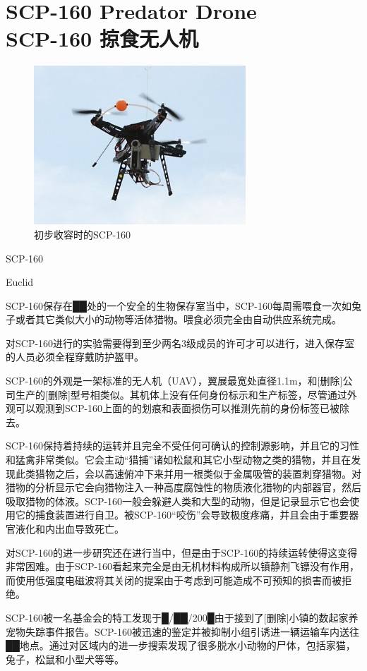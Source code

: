 \chapter[SCP-160 掠食无人机]{
    SCP-160 Predator Drone\\
    SCP-160 掠食无人机
}

\label{chap:SCP-160}

\begin{figure}[H]
    \centering
    \includegraphics[width=0.5\linewidth]{images/SCP.160.jpg}
    \caption*{初步收容时的SCP-160}
\end{figure}

SCP-160

Euclid

SCP-160保存在██处的一个安全的生物保存室当中，SCP-160每周需喂食一次如兔子或者其它类似大小的动物等活体猎物。喂食必须完全由自动供应系统完成。

对SCP-160进行的实验需要得到至少两名3级成员的许可才可以进行，进入保存室的人员必须全程穿戴防护盔甲。

SCP-160的外观是一架标准的无人机（UAV），翼展最宽处直径1.1m，和{[}删除]公司生产的{[}删除]型号相类似。其机体上没有任何身份标示和生产标签，尽管通过外观可以观测到SCP-160上面的的划痕和表面损伤可以推测先前的身份标签已被除去。

SCP-160保持着持续的运转并且完全不受任何可确认的控制源影响，并且它的习性和猛禽非常类似。它会主动“猎捕”诸如松鼠和其它小型动物之类的猎物，并且在发现此类猎物之后，会以高速俯冲下来并用一根类似于金属吸管的装置刺穿猎物。对猎物的分析显示它会向猎物注入一种高度腐蚀性的物质液化猎物的内部器官，然后吸取猎物的体液。SCP-160一般会躲避人类和大型的动物，但是记录显示它也会使用它的捕食装置进行自卫。被SCP-160“咬伤”会导致极度疼痛，并且会由于重要器官液化和内出血导致死亡。

对SCP-160的进一步研究还在进行当中，但是由于SCP-160的持续运转使得这变得非常困难。由于SCP-160看起来完全是由无机材料构成所以镇静剂飞镖没有作用，而使用低强度电磁波将其关闭的提案由于考虑到可能造成不可预知的损害而被拒绝。

SCP-160被一名基金会的特工发现于█\slash ██\slash 200█由于接到了{[}删除]小镇的数起家养宠物失踪事件报告。SCP-160被迅速的鉴定并被抑制小组引诱进一辆运输车内送往██地点。通过对区域内的进一步搜索发现了很多脱水小动物的尸体，包括家猫，兔子，松鼠和小型犬等等。
